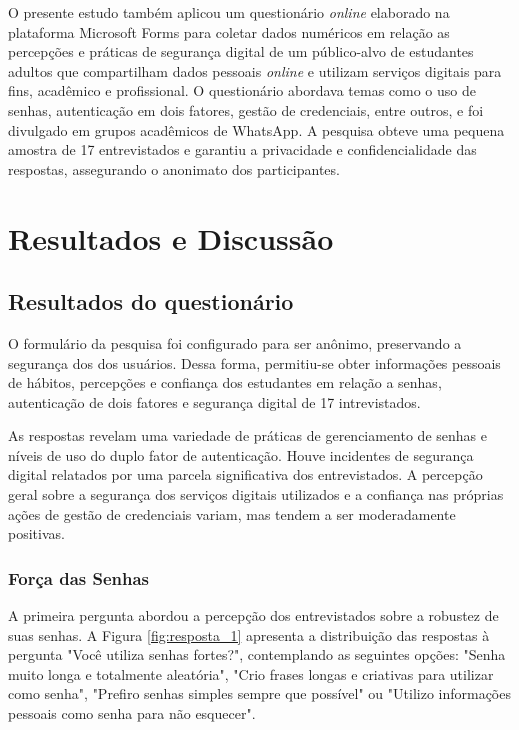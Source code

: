 \documentclass[12pt]{article}
\begin{document}
O presente estudo também aplicou um questionário \textit{online} \cite{forms2025} elaborado
na plataforma Microsoft Forms para coletar dados numéricos em relação as percepções e
práticas de segurança digital de um público-alvo de estudantes adultos que compartilham dados
pessoais \textit{online} e utilizam serviços digitais para fins, acadêmico e profissional.
O questionário abordava temas como o uso de senhas, autenticação em dois fatores, gestão de
credenciais, entre outros, e foi divulgado em grupos acadêmicos de WhatsApp.
A pesquisa obteve uma pequena amostra de 17 entrevistados e garantiu a privacidade e
confidencialidade das respostas, assegurando o anonimato dos participantes.

\section{Resultados e Discussão}

\subsection{Resultados do questionário}

O formulário da pesquisa foi configurado para ser anônimo, preservando a segurança dos
dos usuários.
Dessa forma, permitiu-se obter informações pessoais de hábitos, percepções e confiança
dos estudantes em relação a senhas, autenticação de dois fatores e segurança digital de
17 intrevistados.

As respostas revelam uma variedade de práticas de gerenciamento de senhas e níveis
de uso do duplo fator de autenticação.
Houve incidentes de segurança digital relatados por uma parcela significativa dos
entrevistados.
A percepção geral sobre a segurança dos serviços digitais utilizados e a confiança
nas próprias ações de gestão de credenciais variam, mas tendem a ser moderadamente
positivas.

\subsubsection{Força das Senhas}

A primeira pergunta abordou a percepção dos entrevistados sobre a robustez de suas senhas.
A Figura \ref{fig:resposta_1} apresenta a distribuição das respostas à pergunta "Você
utiliza senhas fortes?", contemplando as seguintes opções: "Senha muito longa e
totalmente aleatória", "Crio frases longas e criativas para utilizar como senha",
"Prefiro senhas simples sempre que possível" ou "Utilizo informações pessoais como senha
para não esquecer".
\end{document}
